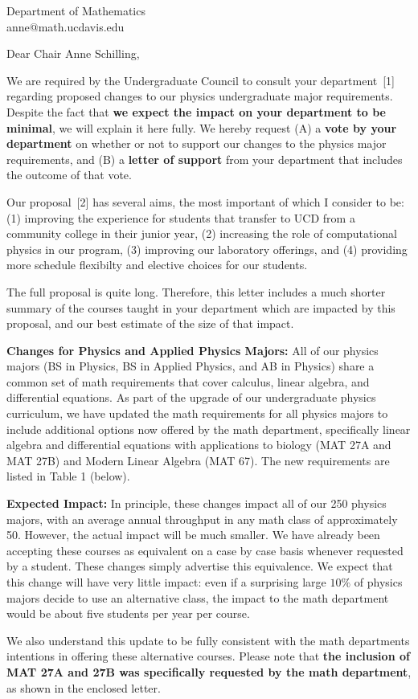\documentclass[letterpaper,12pt]{letter}
\def\letterparta{
We are required by the Undergraduate Council to consult your
department~[1] regarding proposed changes to our physics undergraduate
major requirements.  Despite the fact that {\bf we expect the
  impact on your department to be minimal}, we will explain it here
fully.  We hereby request (A) a {\bf vote by your department} on
whether or not to support our changes to the physics major
requirements, and (B) a {\bf letter of support} from your department
that includes the outcome of that vote.

Our proposal~[2] has several aims, the most important of which I
consider to be: (1) improving the experience for students that
transfer to UCD from a community college in their junior year, (2)
increasing the role of computational physics in our program, (3)
improving our laboratory offerings, and (4) providing more schedule
flexibilty and elective choices for our students.

The full proposal is quite long.  Therefore, this letter includes a
much shorter summary of the courses taught in your department which
are impacted by this proposal, and our best estimate of the size of
that impact.
}
\begin{document}

\begin{letter}{Department of Mathematics \\ anne@math.ucdavis.edu}

\opening{Dear Chair Anne Schilling,}

\letterparta

{\bf Changes for Physics and Applied Physics Majors:} All of our
physics majors (BS in Physics, BS in Applied Physics, and AB in
Physics) share a common set of math requirements that cover calculus,
linear algebra, and differential equations.  As part of the upgrade of
our undergraduate physics curriculum, we have updated the math
requirements for all physics majors to include additional options now
offered by the math department, specifically linear algebra and
differential equations with applications to biology (MAT 27A and MAT
27B) and Modern Linear Algebra (MAT 67).  The new requirements are
listed in Table 1 (below).

{\bf Expected Impact:} In principle, these changes impact all of our
250 physics majors, with an average annual throughput in any math
class of approximately 50.  However, the actual impact will be much
smaller.  We have already been accepting these courses as equivalent
on a case by case basis whenever requested by a student.  These
changes simply advertise this equivalence.  We expect that this change
will have very little impact: even if a surprising large $10\%$ of
physics majors decide to use an alternative class, the impact to the
math department would be about five students per year per course.

We also understand this update to be fully consistent with the math
departments intentions in offering these alternative courses.  Please
note that {\bf the inclusion of MAT 27A and 27B was specifically
  requested by the math department}, as shown in the enclosed letter.


\end{letter}
\end{document}

